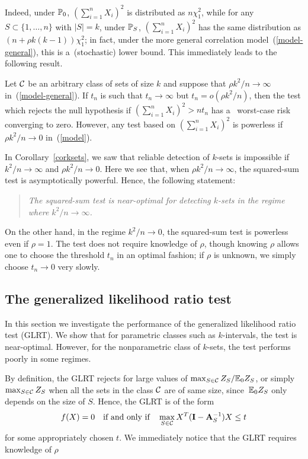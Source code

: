 \documentclass[10pt, oneside]{article}
\begin{document}
Indeed, under $\mathbb{P}_0$, $(\sum_{i=1}^n X_i)^2$ is distributed as $n
\chi_1^2$, while for
any $S\subset\{1,\ldots,n\}$ with $|S|=k$, under
$\mathbb{P}_S$, $(\sum_{i=1}^n X_i)^2$ has the same distribution
as $(n + \rho k(k-1)) \chi_1^2$; in fact, under the more general
correlation model~(\ref{model-general}), this is a~(stochastic) lower
bound. This immediately leads to the following result.
%
\begin{prop}
\label{prpsq}
Let ${\mathcal C}$ be an arbitrary class of sets of size $k$
and suppose that $\rho k^2/n \to\infty$ in~(\ref{model-general}).
If $t_n$ is such that $t_n\to\infty$ but $t_n = o(\rho k^2/n)$,
then the test which rejects the null hypothesis
if $(\sum_{i=1}^n X_i)^2 > n t_n$
has a~%
worst-case
risk converging to zero.
However, any test based on $(\sum_{i=1}^n X_i)^2$ is powerless if
$\rho k^2/n \to0$ in~(\ref{model}).
\end{prop}

In Corollary~\ref{corksets}, we saw that reliable detection of
$k$-sets is
impossible if $k^2/n \to\infty$ and $\rho k^2/n \to0$. Here we see
that, when $\rho k^2/n \to\infty$, the\vadjust{\goodbreak} squared-sum test is
asymptotically powerful. Hence, the following statement:

\begin{quote}
{\normalsize\textit{The squared-sum test is near-optimal for detecting
$k$-sets in the regime where $k^2/n \to\infty$.}}
\end{quote}
%
On the other hand, in the regime $k^2/n \to0$, the squared-sum test is
powerless even if $\rho= 1$.
The test does not require knowledge of $\rho$, though knowing $\rho$ allows
one to choose the threshold $t_n$ in an optimal fashion; if $\rho$ is
unknown, we simply choose $t_n \to0$ very slowly.

\subsection{The generalized likelihood ratio test}
\label{secglrt}

In this section we investigate the performance of the generalized
likelihood ratio test (GLRT). We show that for parametric classes such
as $k$-intervals, the test is near-optimal. However, for the
nonparametric class of $k$-sets,
the test performs poorly in some regimes.

By definition, the GLRT rejects for large values of $\max_{S \in{\mathcal C}}
Z_S/\mathbb{E}_0 Z_S$, or simply $\max_{S \in{\mathcal C}} Z_S$ when all the sets in
the class ${\mathcal C}$ are of same size, since~$\mathbb{E}_0 Z_S$ only depends on
the size of $S$. Hence, the GLRT is of the form
%
\[
f(X)=0  \quad\mbox{if and only if}\quad
\max_{S \in{\mathcal C}} X^T (\mathbf{I}- \mathbf{A}_S^{-1}) X \leq t
\]
%
for some appropriately chosen $t$. We immediately notice that the GLRT
requires knowledge of $\rho$
\end{document}
